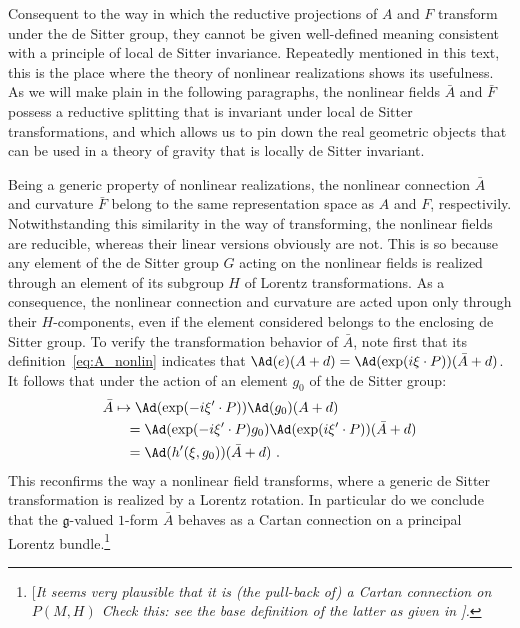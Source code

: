 \documentclass[11pt]{article}
\begin{document}
Consequent to the way in which the reductive projections of $A$ 
and $F$ transform under the de Sitter group, they cannot be given 
well-defined meaning consistent with a principle of local de 
Sitter invariance. Repeatedly mentioned in this text, this is the 
place where the theory of nonlinear realizations shows its 
usefulness. As we will make plain in the following paragraphs, 
the nonlinear fields $\bar{A}$ and $\bar{F}$ possess a reductive 
splitting that is invariant under local de Sitter 
transformations, and which allows us to pin down the real 
geometric objects that can be used in a theory of gravity that is 
locally de Sitter invariant.

Being a generic property of nonlinear realizations, the nonlinear 
connection $\bar{A}$ and curvature $\bar{F}$ belong to the same 
representation space as $A$ and $F$, respectivily.  
Notwithstanding this similarity in the way of transforming, the 
nonlinear fields are reducible, whereas their linear versions 
obviously are not. This is so because any element of the de 
Sitter group $G$ acting on the nonlinear fields is realized 
through an element of its subgroup $H$ of Lorentz 
transformations. As a consequence, the nonlinear connection and 
curvature are acted upon only through their $H$-components, even 
if the element considered belongs to the enclosing de Sitter 
group. To verify the transformation behavior of $\bar{A}$, note 
first that its definition~\eqref{eq:A_nonlin} indicates that 
$\Ad(e)(A+d) = \Ad(\exp(i\xi\cdot P))(\bar{A}+d)$. It follows 
that under the action of an element $g_0$ of the de Sitter group:
%
\begin{displaymath}
\begin{multlined}[b][\linewidth-12\multlinegap]
	\bar{A} \mapsto  \Ad(\exp(-i\xi'\cdot P))\Ad(g_0)(A+d) \\
	\begin{aligned}
	&= \Ad(\exp(-i\xi'\cdot P) g_0) \Ad(\exp(i\xi'\cdot P)) 
	(\bar{A}+d) \\
	&= \Ad(h'(\xi,g_0))(\bar{A}+d)~.
	\end{aligned}
\end{multlined}
\end{displaymath}
This reconfirms the way a nonlinear field transforms, where a 
generic de Sitter transformation is realized by a Lorentz 
rotation. In particular do we conclude that the 
$\mathfrak{g}$-valued $1$-form $\bar{A}$ behaves as a Cartan 
connection on a principal Lorentz bundle.\footnote{[{\blu\it It 
		seems very plausible that it is (the pull-back of) a Cartan 
		connection on $P(M,H)$ Check this: see the base definition 
		of the latter as given in	\cite{sharpe1997diff_geo}].}}
\end{document}
